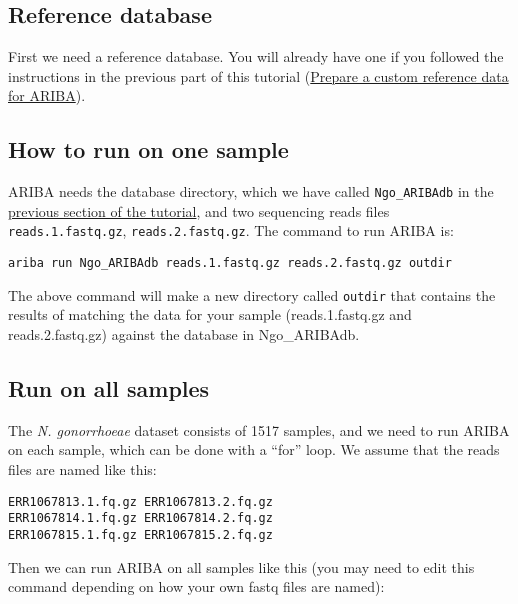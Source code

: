 \documentclass[11pt]{article}
\begin{document}
\hypertarget{reference-database}{%
\subsection{Reference database}\label{reference-database}}

First we need a reference database. You will already have one if you
followed the instructions in the previous part of this tutorial
(\href{make_custom_db.ipynb}{Prepare a custom reference data for
ARIBA}).

    \hypertarget{how-to-run-on-one-sample}{%
\subsection{How to run on one sample}\label{how-to-run-on-one-sample}}

ARIBA needs the database directory, which we have called
\texttt{Ngo\_ARIBAdb} in the \href{make_custom_db.ipynb}{previous
section of the tutorial}, and two sequencing reads files
\texttt{reads.1.fastq.gz}, \texttt{reads.2.fastq.gz}. The command to run
ARIBA is:

\begin{verbatim}
ariba run Ngo_ARIBAdb reads.1.fastq.gz reads.2.fastq.gz outdir
\end{verbatim}

The above command will make a new directory called \texttt{outdir} that
contains the results of matching the data for your sample
(reads.1.fastq.gz and reads.2.fastq.gz) against the database in
Ngo\_ARIBAdb.

    \hypertarget{run-on-all-samples}{%
\subsection{Run on all samples}\label{run-on-all-samples}}

The \textit{N. gonorrhoeae} dataset consists of 1517 samples, and we need
to run ARIBA on each sample, which can be done with a ``for'' loop. We
assume that the reads files are named like this:

\begin{verbatim}
ERR1067813.1.fq.gz ERR1067813.2.fq.gz
ERR1067814.1.fq.gz ERR1067814.2.fq.gz
ERR1067815.1.fq.gz ERR1067815.2.fq.gz
\end{verbatim}

Then we can run ARIBA on all samples like this (you may need to edit
this command depending on how your own fastq files are named):
\end{document}

